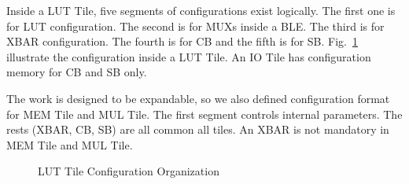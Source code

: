 Inside a LUT Tile, five segments of configurations exist logically. The first
one is for LUT configuration. The second is for MUXs inside a BLE. The third
is for XBAR configuration. The fourth is for CB and the fifth is for SB. 
Fig.~\ref{fig:lut_config_org} illustrate the configuration inside a LUT Tile.
An IO Tile has configuration memory for CB and SB only. \par

The work is designed to be expandable, so we also defined configuration format
for MEM Tile and MUL Tile. The first segment controls internal parameters. The rests
 (XBAR, CB, SB) are all common all tiles. An XBAR is not mandatory in MEM Tile and MUL
Tile. \par

\begin{figure}[htpb]
	\begin{center}
		\epsfysize=1.5in 
		    \renewcommand{\captionfont}{\small}
				\caption{LUT Tile Configuration Organization
				\label{fig:lut_config_org}}
	\end{center}
\end{figure}